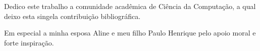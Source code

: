 %
%

\begin{dedicatoria}

Dedico este trabalho a comunidade acadêmica de Ciência da Computação, a qual deixo esta singela contribuição bibliográfica.

Em especial a minha esposa Aline e meu filho Paulo Henrique pelo apoio moral e forte inspiração. 

\end{dedicatoria}
